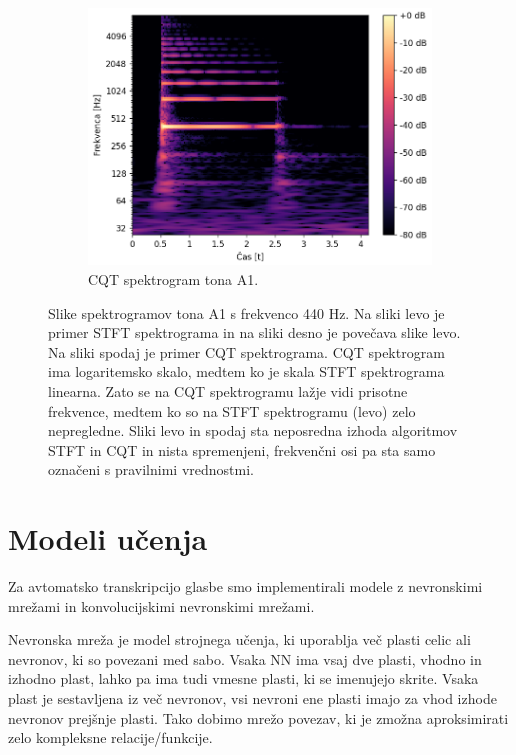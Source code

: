\documentclass[a4paper, 12pt, openright]{book}
\begin{document}
\begin{figure}
\begin{subfigure}[t]{.45\textwidth}
        \centering
        \includegraphics[width=\linewidth]{cqt.png}
        \caption{CQT spektrogram tona A1.}
        \label{fig:cqt}
    \end{subfigure}
    
    \caption{Slike spektrogramov tona A1 s frekvenco 440 Hz. Na sliki levo je primer STFT spektrograma in na sliki desno je povečava slike levo. Na sliki spodaj je primer CQT spektrograma. CQT spektrogram ima logaritemsko skalo, medtem ko je skala STFT spektrograma linearna. Zato se na CQT spektrogramu lažje vidi prisotne frekvence, medtem ko so na STFT spektrogramu (levo) zelo nepregledne. Sliki levo in spodaj sta neposredna izhoda algoritmov STFT in CQT in nista spremenjeni, frekvenčni osi pa sta samo označeni s pravilnimi vrednostmi.}
    \label{fig:spectrogram}
\end{figure}

\section{Modeli učenja}

Za avtomatsko transkripcijo glasbe smo implementirali modele z nevronskimi mrežami in konvolucijskimi nevronskimi mrežami.

Nevronska mreža je model strojnega učenja, ki uporablja več plasti celic ali nevronov, ki so povezani med sabo.
Vsaka NN ima vsaj dve plasti, vhodno in izhodno plast, lahko pa ima tudi vmesne plasti, ki se imenujejo skrite.
Vsaka plast je sestavljena iz več nevronov, vsi nevroni ene plasti imajo za vhod izhode nevronov prejšnje plasti.
Tako dobimo mrežo povezav, ki je zmožna aproksimirati zelo kompleksne relacije/funkcije.
\end{document}

